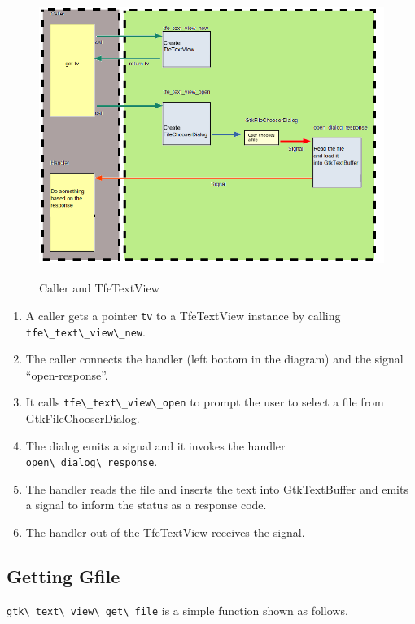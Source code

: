 \begin{figure}
\centering
\includegraphics[width=12.405cm,height=9.225cm]{../image/open.png}
\caption{Caller and TfeTextView}
\end{figure}

\begin{enumerate}
\def\labelenumi{\arabic{enumi}.}
\tightlist
\item
  A caller gets a pointer \passthrough{\lstinline!tv!} to a TfeTextView
  instance by calling \passthrough{\lstinline!tfe\_text\_view\_new!}.
\item
  The caller connects the handler (left bottom in the diagram) and the
  signal ``open-response''.
\item
  It calls \passthrough{\lstinline!tfe\_text\_view\_open!} to prompt the
  user to select a file from GtkFileChooserDialog.
\item
  The dialog emits a signal and it invokes the handler
  \passthrough{\lstinline!open\_dialog\_response!}.
\item
  The handler reads the file and inserts the text into GtkTextBuffer and
  emits a signal to inform the status as a response code.
\item
  The handler out of the TfeTextView receives the signal.
\end{enumerate}

\hypertarget{getting-gfile}{%
\subsection{Getting Gfile}\label{getting-gfile}}

\passthrough{\lstinline!gtk\_text\_view\_get\_file!} is a simple
function shown as follows.

